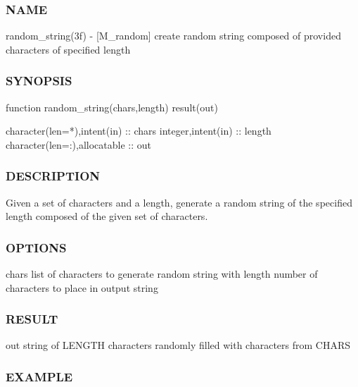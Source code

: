 \subsubsection*{N\+A\+ME}

random\+\_\+string(3f) -\/ \mbox{[}M\+\_\+random\mbox{]} create random string composed of provided characters of specified length 

\subsubsection*{S\+Y\+N\+O\+P\+S\+IS}

\begin{DoxyVerb}function random_string(chars,length) result(out)

 character(len=*),intent(in)     :: chars
 integer,intent(in)              :: length
 character(len=:),allocatable    :: out
\end{DoxyVerb}


\subsubsection*{D\+E\+S\+C\+R\+I\+P\+T\+I\+ON}

Given a set of characters and a length, generate a random string of the specified length composed of the given set of characters.

\subsubsection*{O\+P\+T\+I\+O\+NS}

chars list of characters to generate random string with length number of characters to place in output string

\subsubsection*{R\+E\+S\+U\+LT}

out string of L\+E\+N\+G\+TH characters randomly filled with characters from C\+H\+A\+RS

\subsubsection*{E\+X\+A\+M\+P\+LE}

